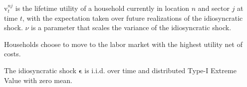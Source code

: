 \documentclass[10pt]{article}
\begin{document}
$\mathrm{v}_t^{n j}$ is the lifetime utility of a 
household currently in location $n$ and sector $j$ at time $t$, with 
the expectation taken over future realizations of the idiosyncratic shock. 
$\nu$ is a parameter that scales the variance of the idiosyncratic shock.

Households choose to move to the labor market 
with the highest utility net of costs.

\begin{notes}[Assumption 2]
    The idiosyncratic shock $\boldsymbol{\epsilon}$ is i.i.d. over time 
    and distributed Type-I Extreme Value with zero mean.
\end{notes}
\end{document}
